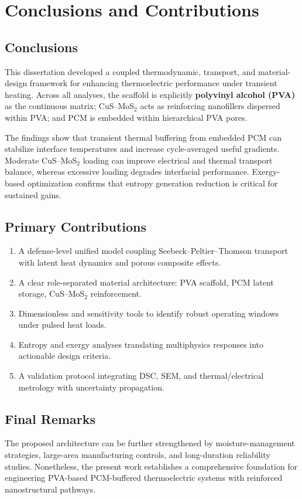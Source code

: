\chapter{Conclusions and Contributions}\label{ch:conclusion}

\section{Conclusions}
This dissertation developed a coupled thermodynamic, transport, and material-design framework for enhancing thermoelectric performance under transient heating. Across all analyses, the scaffold is explicitly \textbf{polyvinyl alcohol (PVA)} as the continuous matrix; CuS--MoS$_2$ acts as reinforcing nanofillers dispersed within PVA; and PCM is embedded within hierarchical PVA pores.

The findings show that transient thermal buffering from embedded PCM can stabilize interface temperatures and increase cycle-averaged useful gradients. Moderate CuS--MoS$_2$ loading can improve electrical and thermal transport balance, whereas excessive loading degrades interfacial performance. Exergy-based optimization confirms that entropy generation reduction is critical for sustained gains.

\section{Primary Contributions}
\begin{enumerate}
    \item A defense-level unified model coupling Seebeck--Peltier--Thomson transport with latent heat dynamics and porous composite effects.
    \item A clear role-separated material architecture: PVA scaffold, PCM latent storage, CuS--MoS$_2$ reinforcement.
    \item Dimensionless and sensitivity tools to identify robust operating windows under pulsed heat loads.
    \item Entropy and exergy analyses translating multiphysics responses into actionable design criteria.
    \item A validation protocol integrating DSC, SEM, and thermal/electrical metrology with uncertainty propagation.
\end{enumerate}

\section{Final Remarks}
The proposed architecture can be further strengthened by moisture-management strategies, large-area manufacturing controls, and long-duration reliability studies. Nonetheless, the present work establishes a comprehensive foundation for engineering PVA-based PCM-buffered thermoelectric systems with reinforced nanostructural pathways.


